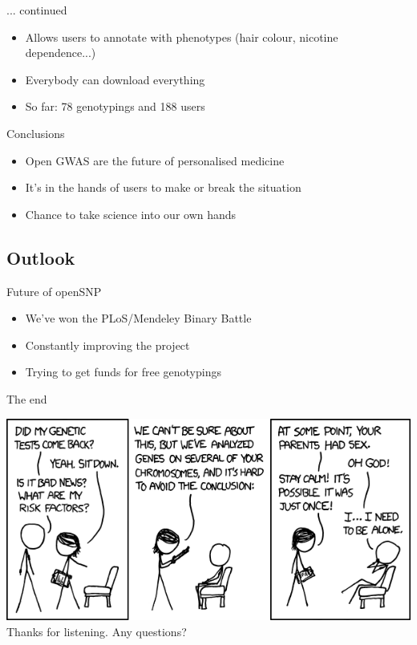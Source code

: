 \documentclass[12pt,a4paper]{beamer}
\begin{document}
\begin{frame}{... continued}
\begin{itemize}
\item Allows users to annotate with phenotypes (hair colour, nicotine dependence...)
\pause \item Everybody can download everything
\pause \item So far: 78 genotypings and 188 users %
\end{itemize}
\end{frame}

\begin{frame}{Conclusions}
\begin{itemize}
\item Open GWAS are the future of personalised medicine
\pause \item It's in the hands of users to make or break the situation
\pause \item Chance to take science into our own hands %
\end{itemize}
\end{frame}

\subsection{Outlook}
\begin{frame}{Future of openSNP}
\begin{itemize}
\item We've won the PLoS/Mendeley Binary Battle
\pause \item Constantly improving the project
\pause \item Trying to get funds for free genotypings
\end{itemize}
\end{frame}

\begin{frame}{The end}
\begin{center}
\includegraphics[scale=0.5]{genetic_analysis.png} \\
Thanks for listening. Any questions?
\end{center}
\end{frame}
\end{document}
